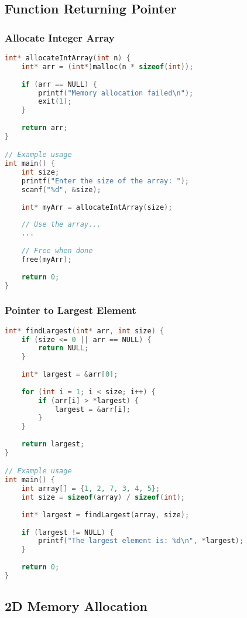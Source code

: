 \documentclass[12pt]{article}
\begin{document}
\subsection{Function Returning Pointer}

\subsubsection{Allocate Integer Array}
\begin{lstlisting}[language=C]
int* allocateIntArray(int n) {
    int* arr = (int*)malloc(n * sizeof(int));
    
    if (arr == NULL) {
        printf("Memory allocation failed\n");
        exit(1);
    }
    
    return arr;
}

// Example usage
int main() {
    int size;
    printf("Enter the size of the array: ");
    scanf("%d", &size);
    
    int* myArr = allocateIntArray(size);
    
    // Use the array...
    ...
    
    // Free when done
    free(myArr);
    
    return 0;
}
\end{lstlisting}

\subsubsection{Pointer to Largest Element}
\begin{lstlisting}[language=C]
int* findLargest(int* arr, int size) {
    if (size <= 0 || arr == NULL) {
        return NULL;
    }
    
    int* largest = &arr[0];
    
    for (int i = 1; i < size; i++) {
        if (arr[i] > *largest) {
            largest = &arr[i];
        }
    }
    
    return largest;
}

// Example usage
int main() {
    int array[] = {1, 2, 7, 3, 4, 5};
    int size = sizeof(array) / sizeof(int);
    
    int* largest = findLargest(array, size);
    
    if (largest != NULL) {
        printf("The largest element is: %d\n", *largest);
    }
    
    return 0;
}
\end{lstlisting}

\subsection{2D Memory Allocation}
\end{document}
